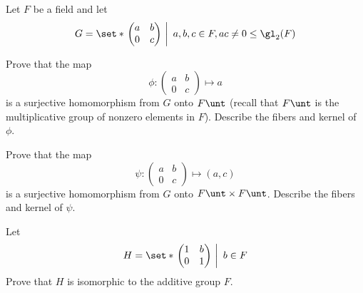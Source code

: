 \begin{exercise}\label{ex3.1.11}
    Let $F$ be a field and let
    \[G = \set*{\left.
    \begin{pmatrix}
        a & b \\
        0 & c 
    \end{pmatrix}~\right|~a, b, c \in F, ac \neq 0} \leq \gl_2(F)\]
    \begin{subproblems}
        \item Prove that the map
        \[\phi : 
        \begin{pmatrix}
            a & b \\
            0 & c
        \end{pmatrix} \mapsto a\]
        is a surjective homomorphism from $G$ onto $F\unt$ (recall that $F\unt$ is the multiplicative group of nonzero elements in $F$). Describe the fibers and kernel of $\phi$.
        \item Prove that the map
        \[\psi : 
        \begin{pmatrix}
            a & b \\
            0 & c
        \end{pmatrix} \mapsto (a, c)\]
        is a surjective homomorphism from $G$ onto $F\unt \times F\unt$. Describe the fibers and kernel of $\psi$. 
        \item Let
        \[H = \set*{\left .
        \begin{pmatrix}
            1 & b \\
            0 & 1
        \end{pmatrix} ~\right\vert~b \in F}\]
        Prove that $H$ is isomorphic to the additive group $F$.
    \end{subproblems}
\end{exercise}

